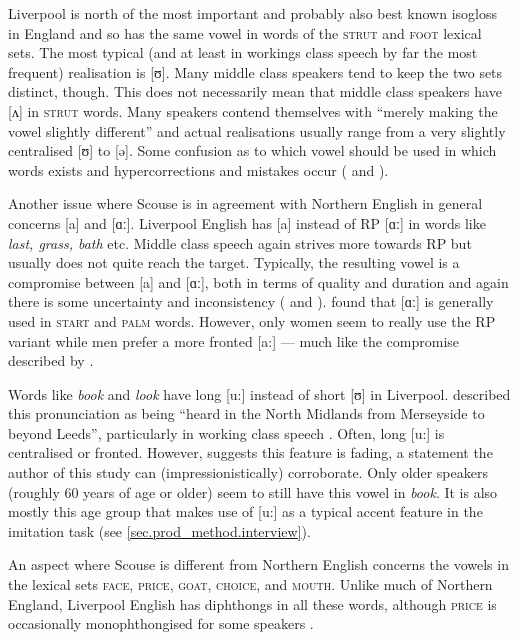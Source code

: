 Liverpool is north of the most important and probably also best known isogloss in England and so has the same vowel in words of the \textsc{strut} and \textsc{foot} lexical sets.
The most typical (and at least in workings class speech by far the most frequent) realisation is [ʊ].
Many middle class speakers tend to keep the  two sets distinct, though.
This does not necessarily mean that middle class speakers have [ʌ] in \textsc{strut} words.
Many speakers contend themselves with ``merely making the vowel slightly different'' \citep[284]{knowles1973} and actual realisations usually range from a very slightly centralised [ʊ] to [ə].
Some confusion as to which vowel should be used in which words exists and hypercorrections and mistakes occur (\citealp[cf.][286--287]{knowles1973} and \citealp[83]{knowles1978}).

Another issue where Scouse is in agreement with Northern English in general concerns [a] and [ɑː].
Liverpool English has [a] instead of RP [ɑː] in words like \emph{last, grass, bath} etc.
Middle class speech again strives more towards RP but usually does not quite reach the target.
Typically, the resulting vowel is a compromise between [a] and [ɑː], both in terms of quality and duration and again there is some uncertainty and inconsistency (\citealp[cf.][287--289]{knowles1973} and \citeyear[83--84]{knowles1978}).
\citeauthor{watson2007} found that [ɑː] is generally used in \textsc{start} and \textsc{palm} words.
However, only women seem to really use the RP variant while men prefer a more fronted [a:] \citeyearpar[cf.][358]{watson2007} --- much like the compromise described by \citeauthor{knowles1973}.

Words like \emph{book} and \emph{look} have long [u:] instead of short [ʊ] in Liverpool.
\citet{knowles1973} described this pronunciation as being ``heard in the North Midlands from Merseyside to beyond Leeds'', particularly in working class speech \citep[290]{knowles1973}.
Often, long [u:] is centralised or fronted.
However, \citet[358]{watson2007} suggests this feature is fading, a statement the author of this study can (impressionistically) corroborate.
Only older speakers (roughly 60 years of age or older) seem to still have this vowel in \emph{book}.
It is also mostly this age group that makes use of [u:] as a typical accent feature in the imitation task (see \ref{sec.prod_method.interview}).

An aspect where Scouse is different from Northern English concerns the vowels in the lexical sets \textsc{face}, \textsc{price}, \textsc{goat}, \textsc{choice}, and \textsc{mouth}.
Unlike much of Northern England, Liverpool English has diphthongs in all these words, although \textsc{price} is occasionally monophthongised for some speakers \citep[cf.][358]{watson2007}.

